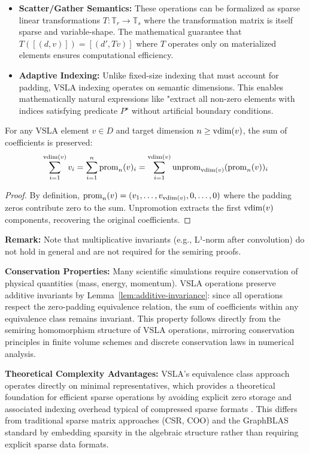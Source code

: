 \begin{itemize}
\item \textbf{Scatter/Gather Semantics:} These operations can be formalized as sparse linear transformations $T: \mathbb{T}_r \to \mathbb{T}_s$ where the transformation matrix is itself sparse and variable-shape. The mathematical guarantee that $T([(d,v)]) = [(d', Tv)]$ where $T$ operates only on materialized elements ensures computational efficiency.

\item \textbf{Adaptive Indexing:} Unlike fixed-size indexing that must account for padding, VSLA indexing operates on semantic dimensions. This enables mathematically natural expressions like "extract all non-zero elements with indices satisfying predicate $P$" without artificial boundary conditions.
\end{itemize}

\begin{lemma}
\label{lem:additive-invariance}
For any VSLA element $v \in D$ and target dimension $n \geq \operatorname{vdim}(v)$, the sum of coefficients is preserved:
\[
\sum_{i=1}^{\operatorname{vdim}(v)} v_i = \sum_{i=1}^{n} \operatorname{prom}_n(v)_i = \sum_{i=1}^{\operatorname{vdim}(v)} \operatorname{unprom}_{\operatorname{vdim}(v)}(\operatorname{prom}_n(v))_i
\]
\end{lemma}
\begin{proof}
By definition, $\operatorname{prom}_n(v) = (v_1, \ldots, v_{\operatorname{vdim}(v)}, 0, \ldots, 0)$ where the padding zeros contribute zero to the sum. Unpromotion extracts the first $\operatorname{vdim}(v)$ components, recovering the original coefficients.
\end{proof}

\textbf{Remark:} Note that multiplicative invariants (e.g., L¹-norm after convolution) do not hold in general and are not required for the semiring proofs.

\textbf{Conservation Properties:} Many scientific simulations require conservation of physical quantities (mass, energy, momentum). VSLA operations preserve additive invariants by Lemma~\ref{lem:additive-invariance}: since all operations respect the zero-padding equivalence relation, the sum of coefficients within any equivalence class remains invariant. This property follows directly from the semiring homomorphism structure of VSLA operations, mirroring conservation principles in finite volume schemes \cite{LeVeque2002} and discrete conservation laws in numerical analysis.

\textbf{Theoretical Complexity Advantages:} VSLA's equivalence class approach operates directly on minimal representatives, which provides a theoretical foundation for efficient sparse operations by avoiding explicit zero storage and associated indexing overhead typical of compressed sparse formats \cite{Saad2003}. This differs from traditional sparse matrix approaches (CSR, COO) \cite{BulucGilbert2008} and the GraphBLAS standard \cite{GraphBLAS2021} by embedding sparsity in the algebraic structure rather than requiring explicit sparse data formats.
